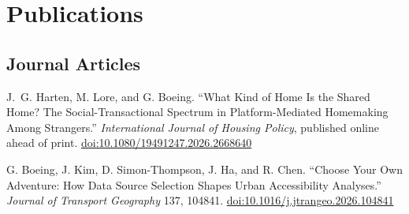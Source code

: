 \documentclass[11pt,letterpaper]{report} %
\begin{document}
\section*{Publications}

\subsection*{Journal Articles}

\begin{tablist}







\item[\the\year] \tab{}J.~G. Harten, M. Lore, and G. Boeing. \enquote{What Kind of Home Is the Shared Home? The Social-Transactional Spectrum in Platform-Mediated Homemaking Among Strangers.} \textit{International Journal of Housing Policy}, published online ahead of print. \href{https://doi.org/10.1080/19491247.2026.2668640}{doi:10.1080/19491247.2026.2668640}

\item[2026] \tab{}G. Boeing, J. Kim, D. Simon-Thompson, J. Ha, and R. Chen. \enquote{Choose Your Own Adventure: How Data Source Selection Shapes Urban Accessibility Analyses.} \textit{Journal of Transport Geography} 137, 104841. \href{https://doi.org/10.1016/j.jtrangeo.2026.104841}{doi:10.1016/j.jtrangeo.2026.104841}


\end{tablist}
\end{document}

